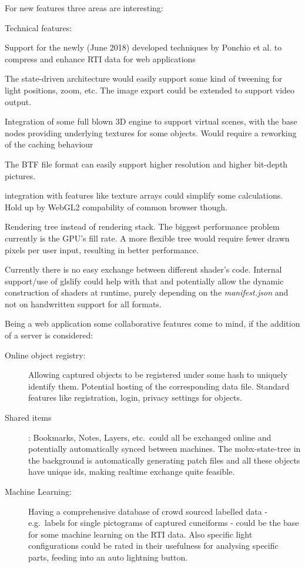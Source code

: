 For new features three areas are interesting:

Technical features:
\begin{description}
\item[Compression:] Support for the newly (June 2018) developed techniques by Ponchio et al\@.
  to compress and enhance RTI data for web
  applications\cite*{ponchio_compact_2018}
\item[Animation support:] The state-driven architecture would easily support some
  kind of tweening for light positions, zoom, etc. The image export could be
  extended to support video output.
\item[3D Engines:] Integration of some full blown 3D engine to support virtual scenes, with
  the base nodes providing underlying textures for some objects. Would require a
  reworking of the caching behaviour
\item[HDR images:] The BTF file format can easily support higher
  resolution and higher bit-depth pictures.
\item[WebGL 2] integration with features like texture arrays could simplify some
  calculations. Hold up by WebGL2 compability of common browser though.
\item Rendering tree instead of rendering stack. The biggest performance problem
  currently is the GPU's fill rate. A more flexible tree would require fewer
  drawn pixels per user input, resulting in better performance.
\item[Shader collation:] Currently there is no easy exchange between different
  shader's code. Internal support/use of glslify\cite*{noauthor_glslify/glslify_2018} could help with that and
  potentially allow the dynamic construction of shaders at runtime, purely depending on
  the \emph{manifest.json} and not on handwritten support for all formats.
\end{description}

Being a web application some collaborative features come to mind, if the
addition of a server is considered:
\begin{description}
\item[Online object registry:] Allowing captured objects to be registered under some
  hash to uniquely identify them. Potential hosting of the corresponding data
  file. Standard features like registration, login, privacy settings for objects.
\item[Shared items]: Bookmarks, Notes, Layers, etc.\ could all be exchanged
  online and potentially automatically synced between machines. The
  mobx-state-tree in the background is automatically generating patch files and
  all these objects have unique ids, making realtime exchange quite feasible.
\item[Machine Learning:] Having a comprehensive database of crowd sourced
  labelled data - e.g.\
  labels for single pictograms of captured cuneiforms - could be the base for
  some machine learning on the RTI data. Also specific light configurations
  could be rated in their usefulness for analysing specific parts, feeding into
  an auto lightning button.
\end{description}

